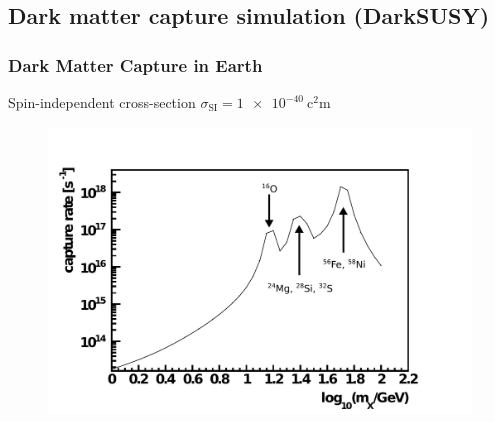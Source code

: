 \documentclass{beamer}
\begin{document}
\subsection{Dark matter capture simulation (DarkSUSY)}
\begin{frame}
	\frametitle{Dark Matter Capture in Earth}
	Spin-independent cross-section $\sigma_{\mathrm{SI}} =
	\SI{1e-40}{\square\centi\meter}$
	\begin{figure}
		\centering
		\includegraphics[width=0.75\linewidth]{wimp_capture_rate.pdf}
	\end{figure}
\end{frame}
\end{document}
